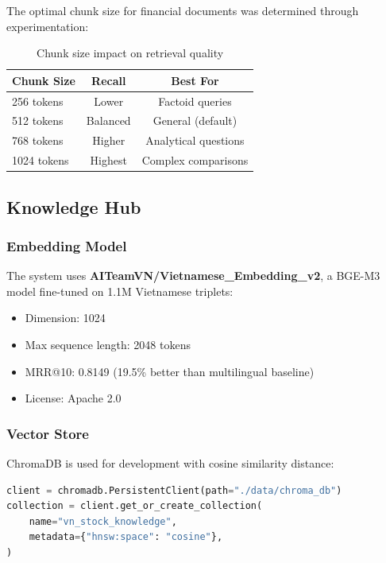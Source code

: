 \documentclass[12pt,a4paper]{article}
\begin{document}
The optimal chunk size for financial documents was determined through
 experimentation:

\begin{table}[H]
\centering
\caption{Chunk size impact on retrieval quality}
\label{tab:chunk_size}
\begin{tabular}{lcc}
\toprule
\textbf{Chunk Size} & \textbf{Recall} & \textbf{Best For} \\
\midrule
256 tokens & Lower & Factoid queries \\
512 tokens & Balanced & General (default) \\
768 tokens & Higher & Analytical questions \\
1024 tokens & Highest & Complex comparisons \\
\bottomrule
\end{tabular}
\end{table}

\subsection{Knowledge Hub}

\subsubsection{Embedding Model}

The system uses \textbf{AITeamVN/Vietnamese\_Embedding\_v2}, a BGE-M3 model
fine-tuned on 1.1M Vietnamese triplets:
\begin{itemize}
    \item Dimension: 1024
    \item Max sequence length: 2048 tokens
    \item MRR@10: 0.8149 (19.5\% better than multilingual baseline)
    \item License: Apache 2.0
\end{itemize}

\subsubsection{Vector Store}

ChromaDB is used for development with cosine similarity distance:
\begin{lstlisting}[language=Python, caption={ChromaDB initialization}]
client = chromadb.PersistentClient(path="./data/chroma_db")
collection = client.get_or_create_collection(
    name="vn_stock_knowledge",
    metadata={"hnsw:space": "cosine"},
)
\end{lstlisting}
\end{document}
